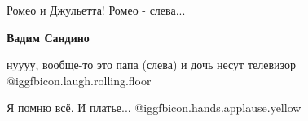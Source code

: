  
 
 
 
 

Ромео и Джульетта! Ромео - слева...

\textbf{Вадим Сандино} 

нуууу, вообще-то это папа (слева) и дочь несут телевизор @igg{fbicon.laugh.rolling.floor} 


Я помню всё. И платье... @igg{fbicon.hands.applause.yellow} 
